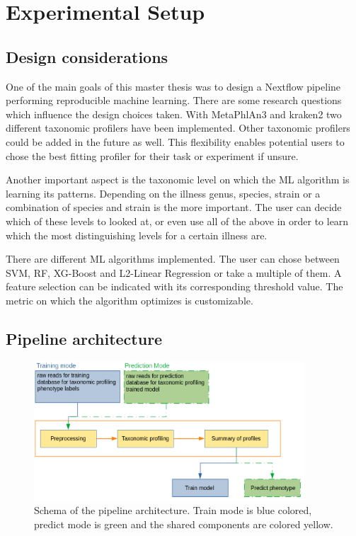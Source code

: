 \chapter{Experimental Setup} 

\label{experimental_setup} 


\section{Design considerations}
One of the main goals of this master thesis was to design a Nextflow pipeline performing reproducible machine learning. 
There are some research questions which influence the design choices taken.
With MetaPhlAn3 and kraken2 two different taxonomic profilers have been implemented. Other taxonomic profilers could be added in the future as well. This flexibility enables potential users to chose the best fitting profiler for their task or experiment if unsure.

Another important aspect is the taxonomic level on which the ML algorithm is learning its patterns. Depending on the illness genus, species, strain or a combination of species and strain is the more important. The user can decide which of these levels to looked at, or even use all of the above in order to learn which the most distinguishing levels for a certain illness are.

There are different ML algorithms implemented. The user can chose between SVM, RF, XG-Boost and L2-Linear Regression or take a multiple of them. 
A feature selection can be indicated with its corresponding threshold value. The metric on which the algorithm optimizes is customizable. 


\section{Pipeline architecture}


\begin{figure}
	\centering
	\includegraphics[width=0.9\textwidth]{Figures/pipeline_schemata_rev}
	\caption{Schema of the pipeline architecture. Train mode is blue colored, predict mode is green and the shared components are colored yellow.}
	\label{fig:schema}
\end{figure}


